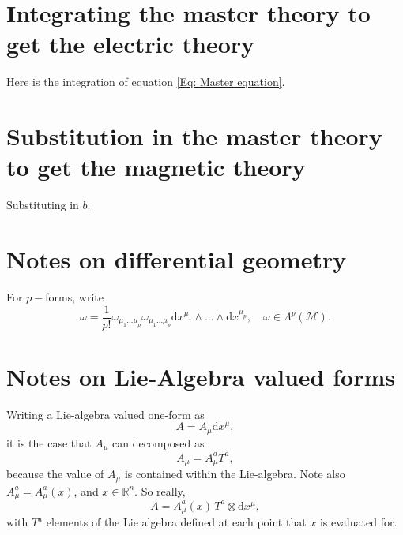 \documentclass{article}
\begin{document}
\section{Integrating the master theory to get the electric theory}
\label{appendixmagneticintegration}
Here is the integration of equation \eqref{Eq: Master equation}. 


\section{Substitution in the master theory to get the magnetic theory}
\label{appendixelectricsubstitution}
Substituting in $b$. 


\section{Notes on differential geometry}
For $p-$forms, write
\begin{equation}
    \omega = \frac{1}{p!}\omega_{\mu_{1}\ldots\mu_{p}}\omega_{\mu_{1}\ldots\mu_{p}}\mathrm{d}x^{\mu_{1}}\wedge \ldots\wedge\mathrm{d}x^{\mu_{p}},\quad \omega\in \Lambda^{p}\left(\mathcal{M}\right).
\end{equation}

\section{Notes on Lie-Algebra valued forms}
Writing a Lie-algebra valued one-form as 
\begin{equation}
    A = A_{\mu}\mathrm{d}x^{\mu},
\end{equation}
it is the case that $A_{\mu}$ can decomposed as 
\begin{equation}
    A_{\mu} = A_{\mu}^{a}T^{a},
\end{equation}
because the value of $A_{\mu}$ is contained within the Lie-algebra. Note also $A_{\mu}^{a} = A_{\mu}^{a}(x)$, and $x\in \mathbb{R}^{n}$. So really,
\begin{equation}
    A = A_{\mu}^{a}(x)\, T^{a}\otimes \mathrm{d}x^{\mu},
\end{equation}
with $T^{a}$ elements of the Lie algebra defined at each point that $x$ is evaluated for. \newline
\end{document}
